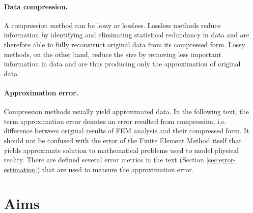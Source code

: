 \paragraph{Data compression.} A compression method can be lossy or lossless. Lossless methods reduce information by identifying and eliminating statistical redundancy in data and are therefore able to fully reconstruct original data from its compressed form. Lossy methods, on the other hand, reduce the size by removing less important information in data and are thus producing only the approximation of original data.

\paragraph{Approximation error.} Compression methods usually yield approximated data. In the following text, the term approximation error denotes an error resulted from compression, i.e. difference between original results of FEM analysis and their compressed form. It should not be confused with the error of the Finite Element Method itself that yields approximate solution to mathematical problems used to model physical reality. There are defined several error metrics in the text (Section \ref{sec:error-estimation}) that are used to measure the approximation error.




\section{Aims} %

